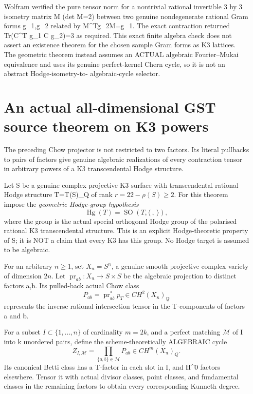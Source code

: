 \documentclass[11pt]{article}
\newcommand{\pr}{\operatorname{pr}}
\begin{document}
Wolfram verified the pure tensor norm
for a nontrivial rational invertible
3 by 3 isometry matrix M
(det M=2) between two genuine
nondegenerate rational Gram forms
g_1,g_2 related by M^Tg_2M=g_1.
The exact contraction returned
Tr(C^T g_1 C g_2)=3 as required.
This exact finite algebra check does not
assert an existence theorem for the
chosen sample Gram forms as K3 lattices.
The geometric theorem instead assumes
an ACTUAL algebraic Fourier--Mukai
equivalence and uses its genuine
perfect-kernel Chern cycle, so it is
not an abstract Hodge-isometry-to-
algebraic-cycle selector.

\section{An actual all-dimensional GST source theorem on K3 powers}
The preceding Chow projector is not restricted
to two factors. Its literal pullbacks to pairs
of factors give genuine algebraic realizations
of every contraction tensor in arbitrary
powers of a K3 transcendental Hodge structure.

Let S be a genuine complex projective K3
surface with transcendental rational
Hodge structure T=T(S)_Q of rank
\(
 r=22-\rho(S)\ge2.
\)
For this theorem impose the \emph{geometric
Hodge-group hypothesis}
\[
 \boxed{
 \operatorname{Hg}(T)=
    \operatorname{SO}(T,\langle\ ,\ \rangle),}
                                                               \tag{9.1}
\]
where the group is the actual special
orthogonal Hodge group of the polarised
rational K3 transcendental structure.
This is an explicit Hodge-theoretic
property of S; it is NOT a claim that
every K3 has this group. No Hodge
target is assumed to be algebraic.

For an arbitrary \(n\ge1\), set
\(X_n=S^n\), a genuine smooth projective
complex variety of dimension \(2n\).
Let \(\pr_{ab}:X_n\to S\times S\)
be the algebraic projection to distinct
factors a,b. Its pulled-back actual
Chow class
\[
        P_{ab}=\pr_{ab}^*p_T
                   \in CH^2(X_n)_Q              \tag{9.2}
\]
represents the inverse rational
intersection tensor in the T-components
of factors a and b.

For a subset \(I\subset\{1,\ldots,n\}\)
of cardinality \(m=2k\), and a perfect
matching \(\mathcal M\) of I into k
unordered pairs, define the
scheme-theoretically ALGEBRAIC cycle
\[
 \boxed{
 Z_{I,\mathcal M}
      =\prod_{\{a,b\}\in\mathcal M}
             P_{ab}\in CH^{m}(X_n)_Q .}           \tag{9.3}
\]
Its canonical Betti class has a T-factor
in each slot in I, and H^0 factors
elsewhere. Tensor it with actual
divisor classes, point classes, and
fundamental classes in the remaining
factors to obtain every corresponding
Kunneth degree.
\end{document}
